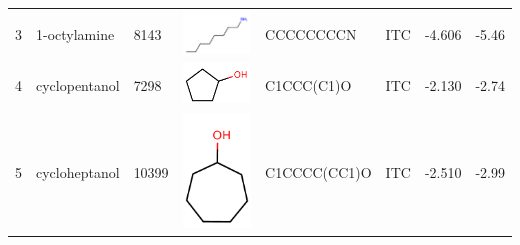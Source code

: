 \documentclass[aps,pre,twocolumn,nofootinbib,superscriptaddress,10pt, final,tightenlines]{revtex4-1}
\begin{document}
\begin{table}
\begin{tabular}{lllp{2cm}>{\ttfamily}llS[table-format=-1.3, table-figures-uncertainty=1]S[table-format=-1.2, table-figures-uncertainty=1]}
3    & 1-octylamine             & 8143     & \parbox[c]{1em}{\includegraphics[scale=0.2]{figures/8143.pdf}}  & CCCCCCCCN       & ITC    & -4.606   & -5.46  \\
4    & cyclopentanol            & 7298     & \parbox[c]{1em}{\includegraphics[scale=0.2]{figures/7298.pdf}}  & C1CCC(C1)O      & ITC    & -2.130   & -2.74  \\
5    & cycloheptanol            & 10399    & \parbox[c]{1em}{\includegraphics[scale=0.2]{figures/10399.pdf}} & C1CCCC(CC1)O    & ITC    & -2.510   & -2.99  \\

\end{tabular}
\end{table}
\end{document}
